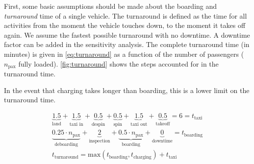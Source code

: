 First, some basic assumptions should be made about the boarding and \textit{turnaround} time of a single vehicle. The turnaround is defined as the time for all activities  from the moment the vehicle touches down, to the moment it takes off again. We assume the fastest possible turnaround with no downtime. A downtime factor can be added in the sensitivity analysis. The complete turnaround time (in minutes) is given in \autoref{eq:turnaround} as a function of the number of passengers ($n_\text{pax}$ fully loaded). \autoref{fig:turnaround} shows the steps accounted for in the turnaround time.

In the event that charging takes longer than boarding, this is a lower limit on the turnaround time.

\begin{equation}\label{eq:turnaround}
\begin{split}
    \underbrace{1.5}_\text{land}+\underbrace{1.5}_\text{taxi in}+\underbrace{0.5}_\text{despin}+\underbrace{0.5}_\text{spin}+\underbrace{1.5}_\text{taxi out}+\underbrace{0.5}_\text{takeoff} = 6 = t_\text{taxi} \\
    \underbrace{0.25\cdot n_\text{pax}}_\text{deboarding}+\underbrace{2}_\text{inspection}+\underbrace{0.5\cdot n_\text{pax}}_\text{boarding}+\underbrace{0}_\text{downtime}  = t_\text{boarding} \\
    t_\text{turnaround} = \text{max}\left( t_\text{boarding}, t_\text{charging}\right) + t_\text{taxi}
\end{split}
\end{equation}


